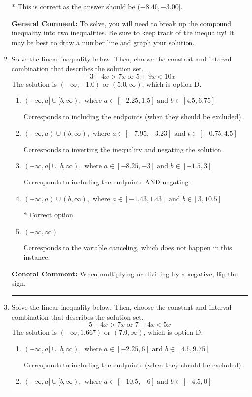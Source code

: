 \documentclass{extbook}[14pt]
\newcommand{\litem}[1]{\item #1

\rule{\textwidth}{0.4pt}}
\begin{document}
\begin{enumerate}
{\begin{enumerate}[label=\Alph*.]
* This is correct as the answer should be $(-8.40, -3.00]$.
\end{enumerate}

\textbf{General Comment:} To solve, you will need to break up the compound inequality into two inequalities. Be sure to keep track of the inequality! It may be best to draw a number line and graph your solution.
}
\litem{
Solve the linear inequality below. Then, choose the constant and interval combination that describes the solution set.
\[ -3 + 4 x > 7 x \text{ or } 5 + 9 x < 10 x \]The solution is \( (-\infty, -1.0) \text{ or } (5.0, \infty) \), which is option D.\begin{enumerate}[label=\Alph*.]
\item \( (-\infty, a] \cup [b, \infty), \text{ where } a \in [-2.25, 1.5] \text{ and } b \in [4.5, 6.75] \)

Corresponds to including the endpoints (when they should be excluded).
\item \( (-\infty, a) \cup (b, \infty), \text{ where } a \in [-7.95, -3.23] \text{ and } b \in [-0.75, 4.5] \)

Corresponds to inverting the inequality and negating the solution.
\item \( (-\infty, a] \cup [b, \infty), \text{ where } a \in [-8.25, -3] \text{ and } b \in [-1.5, 3] \)

Corresponds to including the endpoints AND negating.
\item \( (-\infty, a) \cup (b, \infty), \text{ where } a \in [-1.43, 1.43] \text{ and } b \in [3, 10.5] \)

 * Correct option.
\item \( (-\infty, \infty) \)

Corresponds to the variable canceling, which does not happen in this instance.
\end{enumerate}

\textbf{General Comment:} When multiplying or dividing by a negative, flip the sign.
}
\litem{
Solve the linear inequality below. Then, choose the constant and interval combination that describes the solution set.
\[ 5 + 4 x > 7 x \text{ or } 7 + 4 x < 5 x \]The solution is \( (-\infty, 1.667) \text{ or } (7.0, \infty) \), which is option D.\begin{enumerate}[label=\Alph*.]
\item \( (-\infty, a] \cup [b, \infty), \text{ where } a \in [-2.25, 6] \text{ and } b \in [4.5, 9.75] \)

Corresponds to including the endpoints (when they should be excluded).
\item \( (-\infty, a] \cup [b, \infty), \text{ where } a \in [-10.5, -6] \text{ and } b \in [-4.5, 0] \)


\end{enumerate}}
\end{enumerate}
\end{document}
